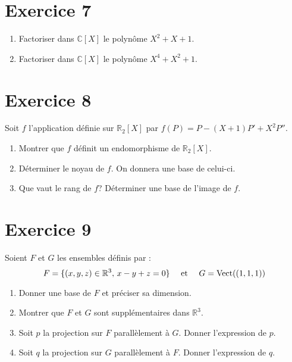 \documentclass[a4paper,twoside,french,10pt]{VcCours}
\begin{document}
\medskip
\section*{Exercice 7}
 

\begin{enumerate}
\item Factoriser dans $\mathbb{C}[X]$ le polynôme $X^2+X+1$.
\item Factoriser dans $\mathbb{C}[X]$ le polynôme $X^4+X^2+1$.
\end{enumerate}

\medskip
 \section*{Exercice 8}
Soit $f$ l'application définie sur $\mathbb{R}_2[X]$ par $f(P)=P-(X+1)P'+X^2 P''$.
\begin{enumerate}
\item Montrer que $f$ définit un endomorphisme de $\mathbb{R}_2[X]$.
\item Déterminer le noyau de $f$. On donnera une base de celui-ci.
\item Que vaut le rang de $f$? Déterminer une base de l'image de $f$.
\end{enumerate}

\medskip
\section*{Exercice 9}
Soient $F$ et $G$ les ensembles définis par :
$$ F = \lbrace (x,y,z) \in \mathbb{R}^3, \, x-y+z=0 \rbrace \quad \hbox{ et }  \quad G = \textrm{Vect}((1,1,1)) $$

\begin{enumerate}
\item Donner une base de $F$ et préciser sa dimension.
\item Montrer que $F$ et $G$ sont supplémentaires dans $\mathbb{R}^3$.
\item Soit $p$ la projection sur $F$ parallèlement à $G$. Donner l'expression de $p$.
\item Soit $q$ la projection sur $G$ parallèlement à $F$. Donner l'expression de $q$.
\end{enumerate}
\end{document}
